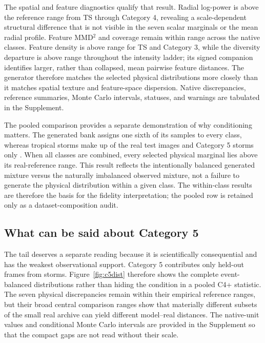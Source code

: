 \documentclass[gmd, manuscript]{copernicus}
\begin{document}
The spatial and feature diagnostics qualify that result. Radial log-power is above
the reference range from TS through Category 4, revealing a scale-dependent
structural difference that is not visible in the seven scalar marginals or the mean
radial profile. Feature MMD\({}^2\) and coverage remain within range across the native
classes. Feature density is above range for TS and Category 3, while the diversity
departure is above range throughout the intensity ladder; its signed companion
identifies larger, rather than collapsed, mean pairwise feature distances. The
generator therefore matches the selected physical distributions more closely than it
matches spatial texture and feature-space dispersion. Native discrepancies,
reference summaries, Monte Carlo intervals, statuses, and warnings are tabulated in
the Supplement.

The pooled comparison provides a separate demonstration of why conditioning matters.
The generated bank assigns one sixth of its samples to every class, whereas tropical
storms make up \RealTropicalStormShare{} of the real test images and Category 5 storms
only \RealCategoryFiveShare{}.
When all classes are combined, every selected physical marginal lies above its
real-reference range. This result reflects the intentionally balanced
generated mixture versus the naturally imbalanced observed mixture, not a failure to
generate the physical distribution within a given class. The within-class results are
therefore the basis for the fidelity interpretation; the pooled row is retained only
as a dataset-composition audit.

\subsection{What can be said about Category 5}

The tail deserves a separate reading because it is scientifically consequential and
has the weakest observational support. Category 5 contributes only \CfiveFrames{}
held-out frames from \CfiveStorms{} storms. Figure~\ref{fig:c5dist} therefore shows
the complete event-balanced distributions rather than hiding the condition in a
pooled C4+ statistic. The seven physical discrepancies remain within their empirical
reference ranges, but their broad central comparison ranges show that materially
different subsets of the small real archive can yield different model--real
distances. The native-unit values and conditional Monte Carlo intervals are provided
in the Supplement so that the compact gaps are not read without their scale.
\end{document}
